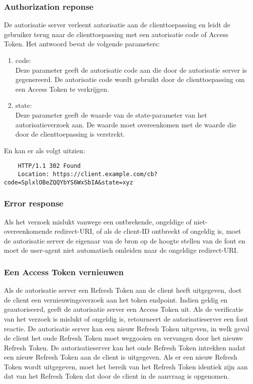 \subsubsection{Authorization reponse}%
\label{subsubsec:authorization-reponse}
De autorisatie server verleent autorisatie aan de clienttoepassing en leidt de gebruiker terug naar de clienttoepassing met een autorisatie code of Access Token. Het antwoord bevat de volgende parameters:
\begin{enumerate}[label=\textbf{-}]
    \item code: \\
    Deze parameter geeft de autorisatie code aan die door de autorisatie server is gegenereerd. De autorisatie code wordt gebruikt door de clienttoepassing om een Access Token te verkrijgen.
  
    \item state: \\
    Deze parameter geeft de waarde van de state-parameter van het autorisatieverzoek aan. De waarde moet overeenkomen met de waarde die door de clienttoepassing is verstrekt.
  \end{enumerate}
  En kan er als volgt uitzien:
  \begin{verbatim}
    HTTP/1.1 302 Found
    Location: https://client.example.com/cb?code=SplxlOBeZQQYbYS6WxSbIA&state=xyz
  \end{verbatim}

  \subsubsection{Error response}%
  \label{subsubsec:error-response}
  Als het verzoek mislukt vanwege een ontbrekende, ongeldige of niet-overeenkomende redirect-URI, of als de client-ID ontbreekt of ongeldig is, moet de autorisatie server de eigenaar van de bron op de hoogte stellen van de fout en moet de user-agent niet automatisch omleiden naar de ongeldige redirect-URI.
  
  \subsubsection{Een Access Token vernieuwen}%
  \label{subsubsec:een-access-token-vernieuwen}
  Als de autorisatie server een Refresh Token aan de client heeft uitgegeven, doet de client een vernieuwingsverzoek aan het token endpoint.
  Indien geldig en geautoriseerd, geeft de autorisatie server een Access Token uit. Als de verificatie van het verzoek is mislukt of ongeldig is, retourneert de autorisatieserver een fout reactie.
  De autorisatie server kan een nieuw Refresh Token uitgeven, in welk geval de client het oude Refresh Token moet weggooien en vervangen door het nieuwe Refresh Token. De autorisatieserver kan het oude Refresh Token intrekken nadat een nieuw Refresh Token aan de client is uitgegeven. Als er een nieuw Refresh Token wordt uitgegeven, moet het bereik van het Refresh Token identiek zijn aan dat van het Refresh Token dat door de client in de aanvraag is opgenomen.
  
